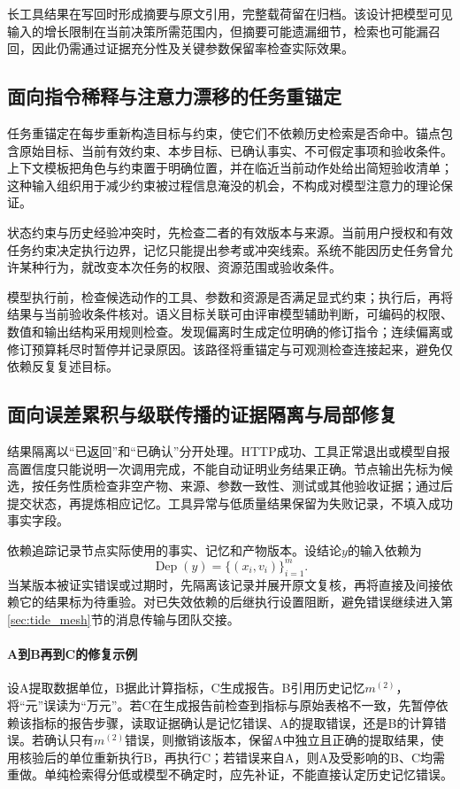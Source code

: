 长工具结果在写回时形成摘要与原文引用，完整载荷留在归档。该设计把模型可见输入的增长限制在当前决策所需范围内，但摘要可能遗漏细节，检索也可能漏召回，因此仍需通过证据充分性及关键参数保留率检查实际效果。

\subsection{面向指令稀释与注意力漂移的任务重锚定}

任务重锚定在每步重新构造目标与约束，使它们不依赖历史检索是否命中。锚点包含原始目标、当前有效约束、本步目标、已确认事实、不可假定事项和验收条件。上下文模板把角色与约束置于明确位置，并在临近当前动作处给出简短验收清单；这种输入组织用于减少约束被过程信息淹没的机会，不构成对模型注意力的理论保证。

状态约束与历史经验冲突时，先检查二者的有效版本与来源。当前用户授权和有效任务约束决定执行边界，记忆只能提出参考或冲突线索。系统不能因历史任务曾允许某种行为，就改变本次任务的权限、资源范围或验收条件。

模型执行前，检查候选动作的工具、参数和资源是否满足显式约束；执行后，再将结果与当前验收条件核对。语义目标关联可由评审模型辅助判断，可编码的权限、数值和输出结构采用规则检查。发现偏离时生成定位明确的修订指令；连续偏离或修订预算耗尽时暂停并记录原因。该路径将重锚定与可观测检查连接起来，避免仅依赖反复复述目标。

\subsection{面向误差累积与级联传播的证据隔离与局部修复}

结果隔离以“已返回”和“已确认”分开处理。HTTP成功、工具正常退出或模型自报高置信度只能说明一次调用完成，不能自动证明业务结果正确。节点输出先标为候选，按任务性质检查非空产物、来源、参数一致性、测试或其他验收证据；通过后提交状态，再提炼相应记忆。工具异常与低质量结果保留为失败记录，不填入成功事实字段。

依赖追踪记录节点实际使用的事实、记忆和产物版本。设结论$y$的输入依赖为
\begin{equation}
\operatorname{Dep}(y)=\{(x_i,v_i)\}_{i=1}^{m}.
\end{equation}
当某版本被证实错误或过期时，先隔离该记录并展开原文复核，再将直接及间接依赖它的结果标为待重验。对已失效依赖的后继执行设置阻断，避免错误继续进入第\ref{sec:tide_mesh}节的消息传输与团队交接。

\paragraph{A到B再到C的修复示例}
设A提取数据单位，B据此计算指标，C生成报告。B引用历史记忆$m^{(2)}$，将“元”误读为“万元”。若C在生成报告前检查到指标与原始表格不一致，先暂停依赖该指标的报告步骤，读取证据确认是记忆错误、A的提取错误，还是B的计算错误。若确认只有$m^{(2)}$错误，则撤销该版本，保留A中独立且正确的提取结果，使用核验后的单位重新执行B，再执行C；若错误来自A，则A及受影响的B、C均需重做。单纯检索得分低或模型不确定时，应先补证，不能直接认定历史记忆错误。

